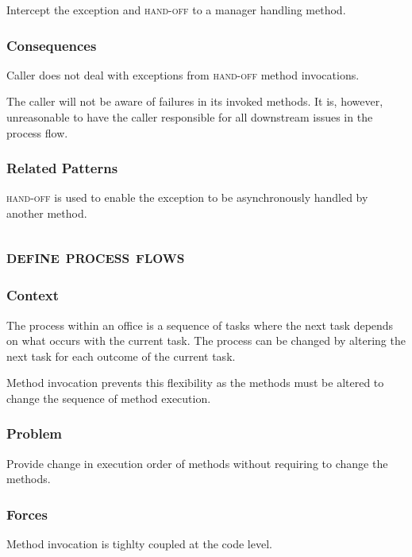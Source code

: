 \documentclass[prodmode]{style/acmlarge}
\begin{document}
Intercept the exception and \textsc{hand-off} to a manager handling method.

\subsubsection*{Consequences}

Caller does not deal with exceptions from \textsc{hand-off} method invocations.

The caller will not be aware of failures in its invoked methods.  It is,
however, unreasonable to have the caller responsible for all downstream issues
in the process flow.

\subsubsection*{Related Patterns}

\textsc{hand-off} is used to enable the exception to be asynchronously handled
by another method.


\subsection{\textsc{\textbf{define process flows}}}

\subsubsection*{Context}

The process within an office is a sequence of tasks where the next task depends
on what occurs with the current task.  The process can be changed by altering
the next task for each outcome of the current task.

Method invocation prevents this flexibility as the methods must be altered to
change the sequence of method execution.

\subsubsection*{Problem}

Provide change in execution order of methods without requiring to change the
methods.

\subsubsection*{Forces}

Method invocation is tighlty coupled at the code level.
\end{document}
